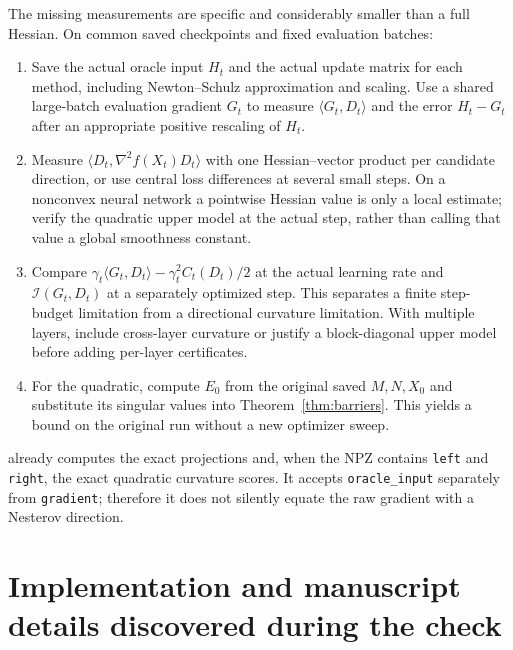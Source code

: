 \documentclass[11pt]{article}
\newcommand{\ip}[2]{\langle #1,#2\rangle}
\begin{document}
The missing measurements are specific and considerably smaller than a full
Hessian. On common saved checkpoints and fixed evaluation batches:
\begin{enumerate}
\item Save the actual oracle input $H_t$ and the actual update matrix for
each method, including Newton--Schulz approximation and scaling. Use a
shared large-batch evaluation gradient $G_t$ to measure
$\ip{G_t}{D_t}$ and the error $H_t-G_t$ after an appropriate positive
rescaling of $H_t$.
\item Measure $\ip{D_t}{\nabla^2 f(X_t)D_t}$ with one Hessian--vector product
per candidate direction, or use central loss differences at several small
steps. On a nonconvex neural network a pointwise Hessian value is only a
local estimate; verify the quadratic upper model at the actual step, rather
than calling that value a global smoothness constant.
\item Compare $\gamma_t\ip{G_t}{D_t}-\gamma_t^2 C_t(D_t)/2$ at the actual
learning rate and $\mathcal I(G_t,D_t)$ at a separately optimized step.
This separates a finite step-budget limitation from a directional curvature
limitation. With multiple layers, include cross-layer curvature or justify
a block-diagonal upper model before adding per-layer certificates.
\item For the quadratic, compute $E_0$ from the original saved $M,N,X_0$ and
substitute its singular values into Theorem~\ref{thm:barriers}. This yields
a bound on the original run without a new optimizer sweep.
\end{enumerate}

 already computes the exact
projections and, when the NPZ contains \texttt{left} and \texttt{right},
the exact quadratic curvature scores. It accepts \texttt{oracle\_input}
separately from \texttt{gradient}; therefore it does not silently equate
the raw gradient with a Nesterov direction.

\section{Implementation and manuscript details discovered during the check}
\end{document}
